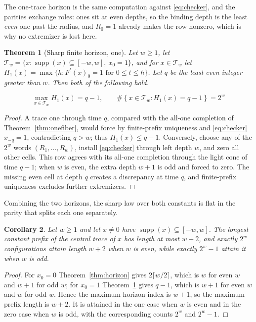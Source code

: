 \documentclass[11pt]{article}
\newtheorem{theorem}{Theorem}
\newtheorem{corollary}[theorem]{Corollary}
\newcommand{\supp}{\operatorname{supp}}
\begin{document}
The one-trace horizon is the same computation against \eqref{eq:checker}, and
the parities exchange roles: ones sit at even depths, so the binding depth is
the least \emph{even} one past the radius, and $R_0=1$ already makes the row
nonzero, which is why no extremizer is lost here.

\begin{theorem}[Sharp finite horizon, one]\label{thm:onehorizon}
Let $w\geq1$, let
$\mathcal T_w=\{x:\supp(x)\subseteq[-w,w],\ x_0=1\}$, and for
$x\in\mathcal T_w$ let
$H_1(x)=\max\{h:F^t(x)_0=1\text{ for }0\leq t\leq h\}$.  Let $q$ be the
least even integer greater than $w$.  Then both of the following hold.

\begin{equation}\label{eq:sharpone}
 \max_{x\in\mathcal T_w}H_1(x)=q-1,
 \qquad
 \#\!\left\{x\in\mathcal T_w:H_1(x)=q-1\right\}=2^w
\end{equation}
\end{theorem}
\begin{proof}
A trace one through time $q$, compared with the all-one completion of
Theorem~\ref{thm:onefiber}, would force by finite-prefix uniqueness and
\eqref{eq:checker} $x_{-q}=1$, contradicting $q>w$; thus $H_1(x)\leq q-1$.
Conversely, choose any of the $2^w$ words $(R_1,\ldots,R_w)$, install
\eqref{eq:checker} through left depth $w$, and zero all other cells.  This row
agrees with its all-one completion through the light cone of time $q-1$; when
$w$ is even, the extra depth $w+1$ is odd and forced to zero.  The missing even
cell at depth $q$ creates a discrepancy at time $q$, and finite-prefix
uniqueness excludes further extremizers.
\end{proof}

Combining the two horizons, the sharp law over both constants is flat in the
parity that splits each one separately.

\begin{corollary}\label{cor:bothhorizon}
Let $w\geq1$ and let $x\neq0$ have $\supp(x)\subseteq[-w,w]$.  The longest
constant prefix of the central trace of $x$ has length at most $w+2$, and
exactly $2^w$ configurations attain length $w+2$ when $w$ is even, while
exactly $2^w-1$ attain it when $w$ is odd.
\end{corollary}
\begin{proof}
For $x_0=0$ Theorem~\ref{thm:horizon} gives $2\lceil w/2\rceil$, which is $w$
for even $w$ and $w+1$ for odd $w$; for $x_0=1$
Theorem~\ref{thm:onehorizon} gives $q-1$, which is $w+1$ for even $w$ and $w$
for odd $w$.  Hence the maximum horizon index is $w+1$, so the maximum prefix
length is $w+2$.  It is attained in the one case when $w$ is even and in the
zero case when $w$ is odd, with the corresponding counts $2^w$ and $2^w-1$.
\end{proof}
\end{document}
